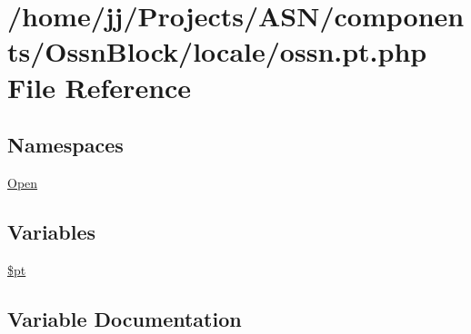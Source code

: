 \hypertarget{components_2_ossn_block_2locale_2ossn_8pt_8php}{}\section{/home/jj/\+Projects/\+A\+S\+N/components/\+Ossn\+Block/locale/ossn.pt.\+php File Reference}
\label{components_2_ossn_block_2locale_2ossn_8pt_8php}
\subsection*{Namespaces}
\begin{DoxyCompactItemize}
\item 
 \hyperlink{namespace_open}{Open}
\end{DoxyCompactItemize}
\subsection*{Variables}
\begin{DoxyCompactItemize}
\item 
\hyperlink{components_2_ossn_block_2locale_2ossn_8pt_8php_a62c150775a7a00e8663463c638016cad}{\$pt}
\end{DoxyCompactItemize}


\subsection{Variable Documentation}
